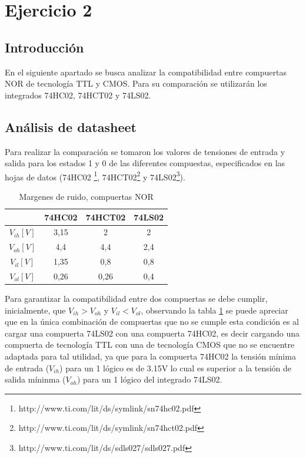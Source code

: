 \section{Ejercicio 2}
\subsection{Introducci\'on}
En el siguiente apartado se busca analizar la compatibilidad entre compuertas NOR de tecnolog\'ia TTL y CMOS. Para su comparaci\'on se utilizar\'an los integrados 74HC02, 74HCT02 y 74LS02.
\subsection{An\'alisis de datasheet}
Para realizar la comparaci\'on se tomaron los valores de tensiones de entrada y salida para los estados 1 y 0 de las diferentes compuestas, especificados en las hojas de datos (74HC02 \footnote{http://www.ti.com/lit/ds/symlink/sn74hc02.pdf}, 74HCT02\footnote{http://www.ti.com/lit/ds/symlink/sn74hct02.pdf}
y 74LS02\footnote{http://www.ti.com/lit/ds/sdls027/sdls027.pdf}).
\begin{table}[H]
\centering
\begin{tabular}{|c||c|c|c|}
\hline
    & 74HC02 & 74HCT02 & 74LS02 \\ \hline \hline 
$V_{ih}[V]$ & 3,15   & 2       & 2      \\
$V_{oh}[V]$ & 4,4    & 4,4     & 2,4    \\
$V_{il}[V]$ & 1,35   & 0,8     & 0,8    \\
$V_{ol}[V]$ & 0,26   & 0,26    & 0,4    \\ \hline
\end{tabular}
\caption{Margenes de ruido, compuertas NOR}
\label{ej2_table_nor}
\end{table}
Para garantizar la compatibilidad entre dos compuertas se debe cumplir, inicialmente, que $V_{ih} > V_{oh}$ y  $V_{il} < V_{ol}$, observando la tabla \ref{ej2_table_nor} se puede apreciar que en la \'unica combinaci\'on de compuertas que no se cumple esta condici\'on es al cargar una compuerta 74LS02 con una compuerta 74HC02, es decir cargando una compuerta de tecnolog\'ia TTL con una de tecnolog\'ia CMOS que no se encuentre adaptada para tal utilidad, ya que para la compuerta 74HC02 la tensi\'on m\'inima de entrada ($V_{ih}$) para un 1 l\'ogico es de 3.15V lo cual es superior a la tensi\'on de salida m\'ininma ($V_{oh}$) para un 1 l\'ogico del integrado 74LS02.
